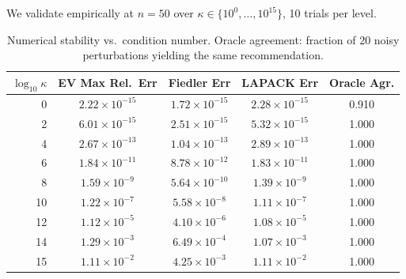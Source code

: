\documentclass[11pt]{article}
\begin{document}
We validate empirically at $n=50$ over $\kappa \in \{10^0, \ldots, 10^{15}\}$, 10 trials per level.

\begin{table}[h]
\centering
\caption{Numerical stability vs.\ condition number. Oracle agreement: fraction of 20 noisy perturbations yielding the same recommendation.}
\label{tab:stability}
\begin{tabular}{rcccc}
\toprule
$\log_{10}\kappa$ & \textbf{EV Max Rel.\ Err} & \textbf{Fiedler Err} & \textbf{LAPACK Err} & \textbf{Oracle Agr.} \\
\midrule
 0 & $2.22 \times 10^{-15}$ & $1.72 \times 10^{-15}$ & $2.28 \times 10^{-15}$ & 0.910 \\
 2 & $6.01 \times 10^{-15}$ & $2.51 \times 10^{-15}$ & $5.32 \times 10^{-15}$ & 1.000 \\
 4 & $2.67 \times 10^{-13}$ & $1.04 \times 10^{-13}$ & $2.89 \times 10^{-13}$ & 1.000 \\
 6 & $1.84 \times 10^{-11}$ & $8.78 \times 10^{-12}$ & $1.83 \times 10^{-11}$ & 1.000 \\
 8 & $1.59 \times 10^{-9}$  & $5.64 \times 10^{-10}$ & $1.39 \times 10^{-9}$  & 1.000 \\
10 & $1.22 \times 10^{-7}$  & $5.58 \times 10^{-8}$  & $1.11 \times 10^{-7}$  & 1.000 \\
12 & $1.12 \times 10^{-5}$  & $4.10 \times 10^{-6}$  & $1.08 \times 10^{-5}$  & 1.000 \\
14 & $1.29 \times 10^{-3}$  & $6.49 \times 10^{-4}$  & $1.07 \times 10^{-3}$  & 1.000 \\
15 & $1.11 \times 10^{-2}$  & $4.25 \times 10^{-3}$  & $1.11 \times 10^{-2}$  & 1.000 \\
\bottomrule
\end{tabular}
\end{table}
\end{document}
